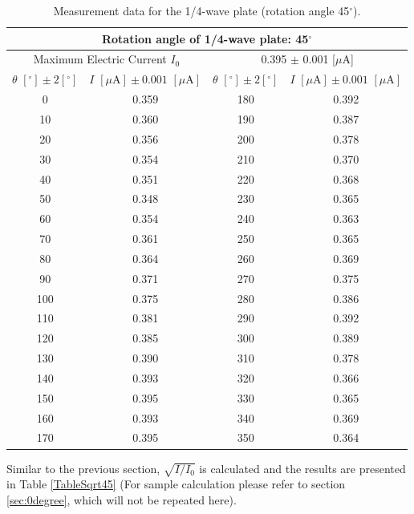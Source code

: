 \documentclass{article}
\begin{document}
\begin{table}[H]\centering
\begin{tabular}{cc||cc}
\multicolumn{4}{c}{Rotation angle of 1/4-wave plate: 45$^\circ$}\\
\toprule
\multicolumn{2}{c}{Maximum Electric Current $I_0$} & \multicolumn{2}{c}{0.395 $\pm$ 0.001 [$\mu$A]}\\
\midrule
$\theta\,\,[^\circ] \pm 2[^\circ]$ & $I\,\,[\mu\text{A}] \pm 0.001\,\,[\mu\text{A}]$ & $\theta\,\,[^\circ] \pm 2[^\circ]$ & $I\,\,[\mu\text{A}] \pm 0.001\,\,[\mu\text{A}]$\\
\midrule
    0     & 0.359  & 180   & 0.392  \\
    10    & 0.360  & 190   & 0.387  \\
    20    & 0.356  & 200   & 0.378  \\
    30    & 0.354  & 210   & 0.370  \\
    40    & 0.351  & 220   & 0.368  \\
    50    & 0.348  & 230   & 0.365  \\
    60    & 0.354  & 240   & 0.363  \\
    70    & 0.361  & 250   & 0.365  \\
    80    & 0.364  & 260   & 0.369  \\
    90    & 0.371  & 270   & 0.375  \\
    100   & 0.375  & 280   & 0.386  \\
    110   & 0.381  & 290   & 0.392  \\
    120   & 0.385  & 300   & 0.389  \\
    130   & 0.390  & 310   & 0.378  \\
    140   & 0.393  & 320   & 0.366  \\
    150   & 0.395  & 330   & 0.365  \\
    160   & 0.393  & 340   & 0.369  \\
    170   & 0.395  & 350   & 0.364  \\
\bottomrule
\end{tabular}
\caption{Measurement data for the 1/4-wave plate (rotation angle 45$^\circ$).}\label{Table1/445}
\end{table}

Similar to the previous section, $\sqrt{I/I_0}$ is calculated and the results are presented in Table \ref{TableSqrt45} (For sample calculation please refer to section \ref{sec:0degree}, which will not be repeated here).
\end{document}
